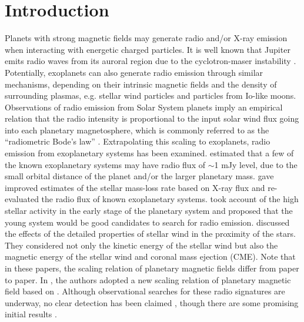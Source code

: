 \documentclass[iop,numberedappendix,apj]{emulateapj}
\begin{document}
  


\section{Introduction}
\label{sec:intro}


Planets with strong magnetic fields may generate radio and/or X-ray emission when interacting with energetic charged particles. 
It is well known that Jupiter emits radio waves from its auroral region due to the cyclotron-maser instability \citep[e.g.][]{wu1979,zarka1998}.  Potentially, exoplanets can also generate radio emission through similar mechanisms, depending on their intrinsic magnetic fields and the density of surrounding plasmas, e.g. stellar wind particles and particles from Io-like moons. 
Observations of radio emission from Solar System planets imply an empirical relation that the radio intensity is proportional to the input solar wind flux going into each planetary magnetosphere, which is commonly referred to as the ``radiometric Bode's law'' \citep{desch+kaiser1984}. 
Extrapolating this scaling to exoplanets, radio emission from exoplanetary systems has been examined. 
\citet{farrell1999,zarka2001,lazio2004} estimated that a few of the known exoplanetary systems may have radio flux of $\sim $1 mJy level, due to the small orbital distance of the planet and/or the larger planetary mass. 
\citet{stevens2005} gave improved estimates of the stellar mass-loss rate based on X-ray flux and re-evaluated the radio flux of known exoplanetary systems. 
\citet{griesmeier2005} took account of the high stellar activity in the early stage of the planetary system and proposed that the young system would be good candidates to search for radio emission. 
\citet{griesmeier2007a, griesmeier2007b} discussed the effects of the detailed properties of stellar wind in the proximity of the stars. They considered not only the kinetic energy of the stellar wind but also the magnetic energy of the stellar wind and coronal mass ejection (CME). 
Note that in these papers, the scaling relation of planetary magnetic fields differ from paper to paper.
In \citet{reiners2010}, the authors adopted a new scaling relation of planetary magnetic field based on \citet{christensen_et_al2009}. 
Although observational searches for these radio signatures are underway, no clear detection has been claimed \citep{bastian2000,george2007,stroe2012,hallinan2013,murphy2015}, though there are some promising initial results \citep{lecavelier_et_al2013,sirothia2014}.
\end{document}
